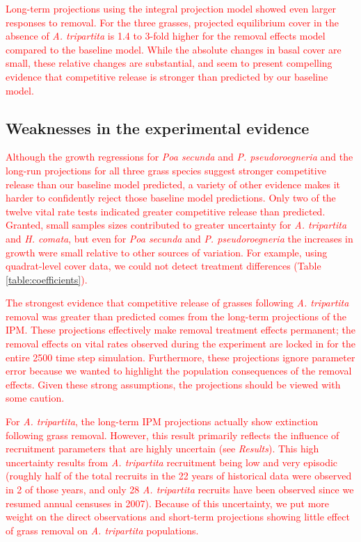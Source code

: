 \documentclass[11pt]{article}
\newcommand{\new}{\textcolor{red}}
\begin{document}
\begin{doublespacing}
\new{Long-term projections using the integral projection model showed even larger responses to removal. For the three grasses, projected equilibrium cover in the absence of \textit{A. tripartita} is 1.4 to 3-fold higher for the removal effects model compared to the baseline model. While the absolute changes in basal cover are small, these relative changes are substantial, and seem to present compelling evidence that competitive release is stronger than predicted by our baseline model.  }

\subsection*{Weaknesses in the experimental evidence}

\new{Although the growth regressions for \textit{Poa secunda} and \textit{P. pseudoroegneria} and the long-run projections for all three grass species suggest stronger competitive release than our baseline model predicted, a variety of other evidence makes it harder to confidently reject those baseline model predictions. Only two of the twelve vital rate tests indicated greater competitive release than predicted. Granted, small samples sizes contributed to greater uncertainty for \textit{A. tripartita} and \textit{H. comata}, but even for \textit{Poa secunda} and \textit{P. pseudoroegneria} the increases in growth were small relative to other sources of variation. For example, using quadrat-level cover data, we could not detect treatment differences (Table \ref{table:coefficients}).  }

\new{The strongest evidence that competitive release of grasses following \textit{A. tripartita} removal was greater than predicted comes from the long-term projections of the IPM. These projections effectively make removal treatment effects permanent; the removal effects on vital rates observed during the experiment are locked in for the entire 2500 time step simulation. Furthermore, these projections ignore parameter error because we wanted to highlight the population consequences of the removal effects. Given these strong assumptions, the projections should be viewed with some caution.  }

\new{For \textit{A. tripartita}, the long-term IPM projections actually show extinction following grass removal.
However, this result primarily reflects the influence of recruitment parameters that are highly uncertain (see \emph{Results}). This high uncertainty results from \textit{A. tripartita} recruitment being low and very episodic (roughly half of the total recruits in the 22 years of historical data were observed in 2 of those years, and only 28 \textit{A. tripartita} recruits have been observed since we resumed annual censuses in 2007). Because of this uncertainty, we put more weight on the direct observations and short-term projections showing little effect of grass removal on \textit{A. tripartita} populations.}


\end{doublespacing}
\end{document}
